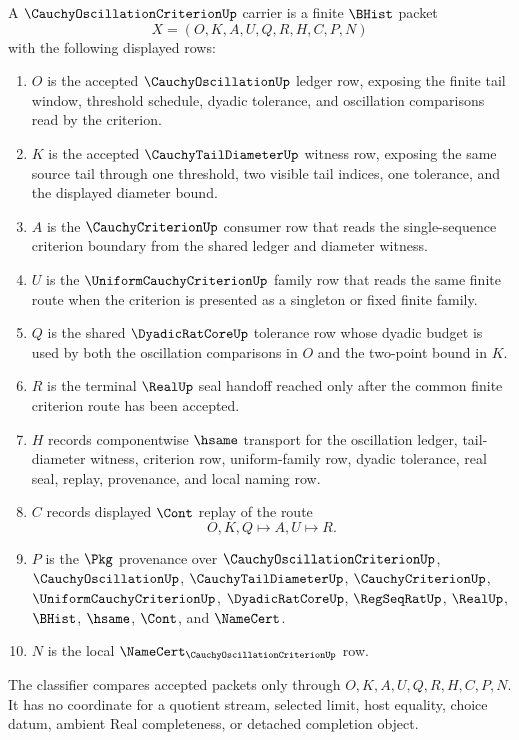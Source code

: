 \begin{definition}
\label{def:cauchy-oscillation-criterion-carrier}
A $\CauchyOscillationCriterionUp$ carrier is a finite $\BHist$ packet
$$
X=(O,K,A,U,Q,R,H,C,P,N)
$$
with the following displayed rows:
\begin{enumerate}
\item $O$ is the accepted $\CauchyOscillationUp$ ledger row, exposing the finite tail window, threshold schedule, dyadic tolerance, and oscillation comparisons read by the criterion.
\item $K$ is the accepted $\CauchyTailDiameterUp$ witness row, exposing the same source tail through one threshold, two visible tail indices, one tolerance, and the displayed diameter bound.
\item $A$ is the $\CauchyCriterionUp$ consumer row that reads the single-sequence criterion boundary from the shared ledger and diameter witness.
\item $U$ is the $\UniformCauchyCriterionUp$ family row that reads the same finite route when the criterion is presented as a singleton or fixed finite family.
\item $Q$ is the shared $\DyadicRatCoreUp$ tolerance row whose dyadic budget is used by both the oscillation comparisons in $O$ and the two-point bound in $K$.
\item $R$ is the terminal $\RealUp$ seal handoff reached only after the common finite criterion route has been accepted.
\item $H$ records componentwise $\hsame$ transport for the oscillation ledger, tail-diameter witness, criterion row, uniform-family row, dyadic tolerance, real seal, replay, provenance, and local naming row.
\item $C$ records displayed $\Cont$ replay of the route
$$
O,K,Q \longmapsto A,U \longmapsto R .
$$
\item $P$ is the $\Pkg$ provenance over $\CauchyOscillationCriterionUp$, $\CauchyOscillationUp$, $\CauchyTailDiameterUp$, $\CauchyCriterionUp$, $\UniformCauchyCriterionUp$, $\DyadicRatCoreUp$, $\RegSeqRatUp$, $\RealUp$, $\BHist$, $\hsame$, $\Cont$, and $\NameCert$.
\item $N$ is the local $\NameCert_{\CauchyOscillationCriterionUp}$ row.
\end{enumerate}
The classifier compares accepted packets only through $O,K,A,U,Q,R,H,C,P,N$. It has no coordinate for a quotient stream, selected limit, host equality, choice datum, ambient Real completeness, or detached completion object.
\end{definition}

